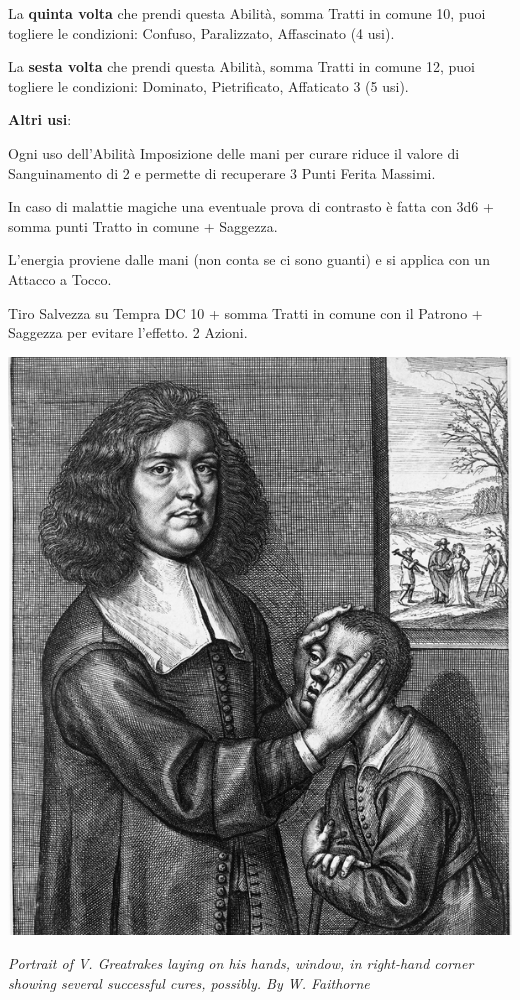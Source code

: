 \begin{multicols}{2}
La \textbf{quinta volta} che prendi questa Abilità, somma Tratti in comune 10, puoi togliere le condizioni: Confuso, Paralizzato, Affascinato (4 usi).

La \textbf{sesta volta} che prendi questa Abilità, somma Tratti in comune 12, puoi togliere le condizioni: Dominato, Pietrificato, Affaticato 3 (5 usi).

\textbf{Altri usi}:

\smallskip

Ogni uso dell'Abilità Imposizione delle mani per curare riduce il valore di Sanguinamento di 2 e permette di recuperare 3 Punti Ferita Massimi.

In caso di malattie magiche una eventuale prova di contrasto è fatta con 3d6 + somma punti Tratto in comune + Saggezza.

L'energia proviene dalle mani (non conta se ci sono guanti) e si applica con un Attacco a Tocco.

Tiro Salvezza su Tempra DC 10 + somma Tratti in comune con il Patrono + Saggezza per evitare l'effetto. 2 Azioni.


\begin{center}
	\includegraphics[width=0.75\linewidth]{immagini/Portrait_of_V_Greatrakesv2.png}

	\emph{Portrait of V. Greatrakes laying on his hands, window, in right-hand corner showing several successful cures, possibly. By W. Faithorne }
\end{center}


\end{multicols}
